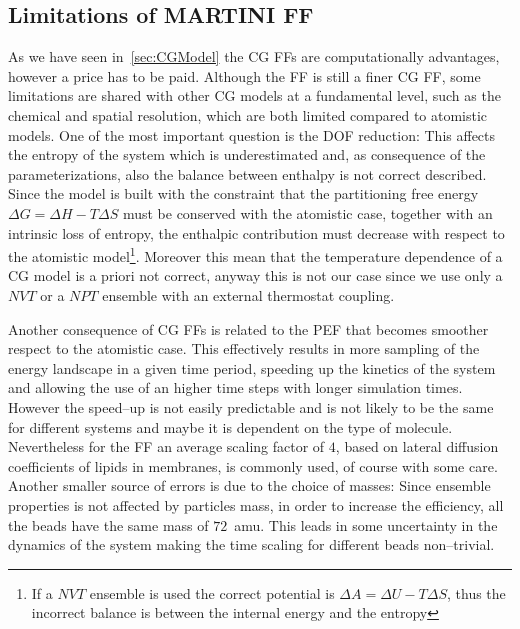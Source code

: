 \subsection{Limitations of MARTINI FF}
As we have seen in~\ref{sec:CGModel} the \ac{CG} \acp{FF} are computationally advantages, however a price has to be paid. Although the \martini \ac{FF} is still a finer \ac{CG} \ac{FF}, some limitations are shared with other \ac{CG} models at a fundamental level, such as the chemical and spatial resolution, which are both limited compared to atomistic models. One of the most important question is the \ac{DOF} reduction: This affects the entropy of the system which is underestimated and, as consequence of the \martini parameterizations, also the balance between enthalpy is not correct described. Since the \martini model is built with the constraint that the partitioning free energy $\Delta G = \Delta H - T\Delta S$ must be conserved with the atomistic case, together with an intrinsic loss of entropy, the enthalpic contribution must decrease with respect to the atomistic model\footnote{If a $NVT$ ensemble is used the correct potential is $\Delta A = \Delta U - T\Delta S$, thus the incorrect balance is between the internal energy and the entropy}. Moreover this mean that the temperature dependence of a \ac{CG} model is a priori not correct, anyway this is not our case since we use only a $NVT$ or a $NPT$ ensemble with an external thermostat coupling.

Another consequence of \ac{CG} \acp{FF} is related to the \ac{PEF} that becomes smoother respect to the atomistic case. This effectively results in more sampling of the energy landscape in a given time period, speeding up the kinetics of the system and allowing the use of an higher time steps with longer simulation times. However the speed--up is not easily predictable and is not likely to be the same for different systems and maybe it is dependent on the type of molecule. Nevertheless for the \martini \ac{FF} an average scaling factor of $4$, based on lateral diffusion coefficients of lipids in membranes, is commonly used, of course with some care. Another smaller source of errors is due to the choice of masses: Since ensemble properties is not affected by particles mass, in order to increase the efficiency, all the \martini beads have the same mass of $72$~amu. This leads in some uncertainty in the dynamics of the system making the time scaling for different beads non--trivial.

